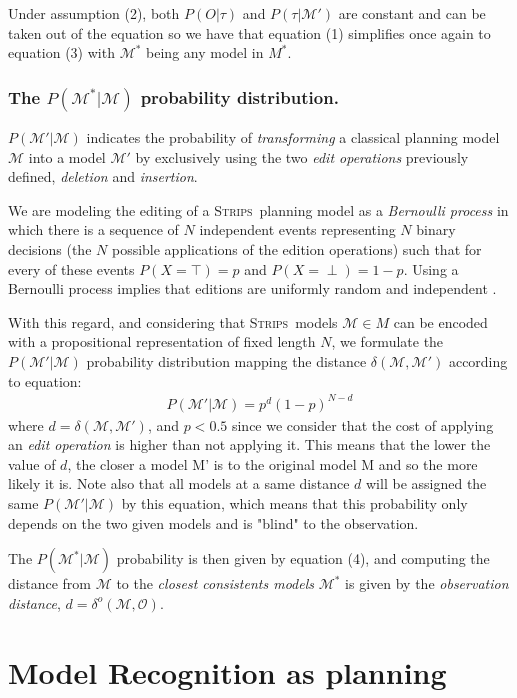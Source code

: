 \documentclass[letterpaper]{article} %
\newcommand{\strips}{\textsc{Strips}}     %
\begin{document}
Under assumption (2), both $P(O|\tau)$ and $P(\tau|\mathcal{M}')$ are constant and can be taken out of the equation so we have that equation (1) simplifies once again to equation (3) with $\mathcal{M}^*$ being any model in $M^*$.


\subsubsection{The $P(\mathcal{M^*}|\mathcal{M})$ probability distribution.} $P(\mathcal{M'}|\mathcal{M})$ indicates the probability of {\em transforming} a classical planning model $\mathcal{M}$ into a model $\mathcal{M'}$ by exclusively using the two {\em edit operations} previously defined, {\em deletion} and {\em insertion}.

We are modeling the editing of a \strips\ planning model as a {\em Bernoulli process} in which there is a sequence of $N$ independent events representing $N$ binary decisions (the $N$ possible applications of the edition operations) such that for every of these events $P(X=\top)=p$ and $P(X=\perp)=1-p$. Using a Bernoulli process implies that editions are uniformly random and independent \cite{devroye2013probabilistic}.

With this regard, and considering that \strips\ models $\mathcal{M}\in M$ can be encoded with a propositional representation of fixed length $N$, we formulate the $P(\mathcal{M'}|\mathcal{M})$ probability distribution mapping the distance $\delta(\mathcal{M},\mathcal{M'})$ according to equation:
\begin{align}
P(\mathcal{M'}|\mathcal{M}) = p^d  (1-p)^{N-d}
\end{align}
where $d=\delta(\mathcal{M},\mathcal{M}')$, and $p<0.5$ since we consider that the cost of applying an {\em edit operation} is higher than not applying it. This means that the lower the value of $d$, the closer a model M' is to the original model M and so the more likely it is. Note also that all models at a same distance $d$ will be assigned the same $P(\mathcal{M'}|\mathcal{M})$ by this equation, which means that this probability only depends on the two given models and is "blind" to the observation.


The $P(\mathcal{M^*}|\mathcal{M})$ probability is then given by equation (4), and computing the distance from $\mathcal{M}$ to the {\em closest consistents models} $\mathcal{M^*}$ is given by the {\em observation distance}, $d=\delta^o(\mathcal{M},\mathcal{O})$.


\section{Model Recognition as planning}
\end{document}
